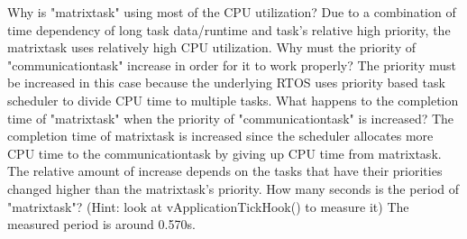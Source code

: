 \documentclass{article}
\begin{document}
Why is "matrixtask" using most of the CPU utilization?
\newline
Due to a combination of time dependency of long task data/runtime and task's relative high priority, the  matrixtask uses relatively high CPU utilization.
\newline
\newline
Why must the priority of "communicationtask" increase in order for it to work properly?
\newline
The priority must be increased in this case because the underlying RTOS uses priority based task scheduler to divide CPU time to multiple tasks.
\newline
\newline
What happens to the completion time of "matrixtask" when the priority of "communicationtask" is increased?
\newline
The completion time of matrixtask is increased since the scheduler allocates more CPU time to the communicationtask by giving up CPU time from matrixtask. The relative amount of increase depends on the tasks that have their priorities changed higher than the matrixtask's priority.
\newline
\newline
How many seconds is the period of "matrixtask"? (Hint: look at vApplicationTickHook() to measure it)
\newline
The measured period is around 0.570s.
\end{document}
